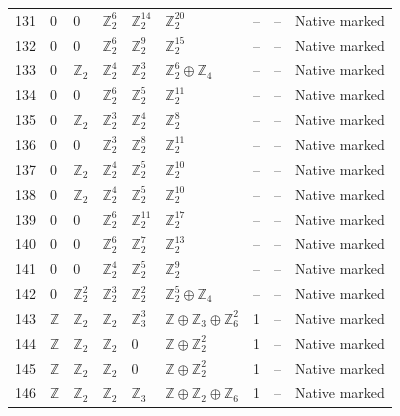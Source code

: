 \documentclass[10pt]{article}
\begin{document}
\begin{longtable}{r|lllll|rrl}
131 & $0$ & $0$ & $\mathbb{Z}_{2}^{6}$ & $\mathbb{Z}_{2}^{14}$ & $\mathbb{Z}_{2}^{20}$ & -- & -- & Native marked\\
132 & $0$ & $0$ & $\mathbb{Z}_{2}^{6}$ & $\mathbb{Z}_{2}^{9}$ & $\mathbb{Z}_{2}^{15}$ & -- & -- & Native marked\\
133 & $0$ & $\mathbb{Z}_{2}$ & $\mathbb{Z}_{2}^{4}$ & $\mathbb{Z}_{2}^{3}$ & $\mathbb{Z}_{2}^{6}\oplus \mathbb{Z}_{4}$ & -- & -- & Native marked\\
134 & $0$ & $0$ & $\mathbb{Z}_{2}^{6}$ & $\mathbb{Z}_{2}^{5}$ & $\mathbb{Z}_{2}^{11}$ & -- & -- & Native marked\\
135 & $0$ & $\mathbb{Z}_{2}$ & $\mathbb{Z}_{2}^{3}$ & $\mathbb{Z}_{2}^{4}$ & $\mathbb{Z}_{2}^{8}$ & -- & -- & Native marked\\
136 & $0$ & $0$ & $\mathbb{Z}_{2}^{3}$ & $\mathbb{Z}_{2}^{8}$ & $\mathbb{Z}_{2}^{11}$ & -- & -- & Native marked\\
137 & $0$ & $\mathbb{Z}_{2}$ & $\mathbb{Z}_{2}^{4}$ & $\mathbb{Z}_{2}^{5}$ & $\mathbb{Z}_{2}^{10}$ & -- & -- & Native marked\\
138 & $0$ & $\mathbb{Z}_{2}$ & $\mathbb{Z}_{2}^{4}$ & $\mathbb{Z}_{2}^{5}$ & $\mathbb{Z}_{2}^{10}$ & -- & -- & Native marked\\
139 & $0$ & $0$ & $\mathbb{Z}_{2}^{6}$ & $\mathbb{Z}_{2}^{11}$ & $\mathbb{Z}_{2}^{17}$ & -- & -- & Native marked\\
140 & $0$ & $0$ & $\mathbb{Z}_{2}^{6}$ & $\mathbb{Z}_{2}^{7}$ & $\mathbb{Z}_{2}^{13}$ & -- & -- & Native marked\\
141 & $0$ & $0$ & $\mathbb{Z}_{2}^{4}$ & $\mathbb{Z}_{2}^{5}$ & $\mathbb{Z}_{2}^{9}$ & -- & -- & Native marked\\
142 & $0$ & $\mathbb{Z}_{2}^{2}$ & $\mathbb{Z}_{2}^{3}$ & $\mathbb{Z}_{2}^{2}$ & $\mathbb{Z}_{2}^{5}\oplus \mathbb{Z}_{4}$ & -- & -- & Native marked\\
143 & $\mathbb{Z}$ & $\mathbb{Z}_{2}$ & $\mathbb{Z}_{2}$ & $\mathbb{Z}_{3}^{3}$ & $\mathbb{Z}\oplus \mathbb{Z}_{3}\oplus \mathbb{Z}_{6}^{2}$ & 1 & -- & Native marked\\
144 & $\mathbb{Z}$ & $\mathbb{Z}_{2}$ & $\mathbb{Z}_{2}$ & $0$ & $\mathbb{Z}\oplus \mathbb{Z}_{2}^{2}$ & 1 & -- & Native marked\\
145 & $\mathbb{Z}$ & $\mathbb{Z}_{2}$ & $\mathbb{Z}_{2}$ & $0$ & $\mathbb{Z}\oplus \mathbb{Z}_{2}^{2}$ & 1 & -- & Native marked\\
146 & $\mathbb{Z}$ & $\mathbb{Z}_{2}$ & $\mathbb{Z}_{2}$ & $\mathbb{Z}_{3}$ & $\mathbb{Z}\oplus \mathbb{Z}_{2}\oplus \mathbb{Z}_{6}$ & 1 & -- & Native marked\\

\end{longtable}
\end{document}
